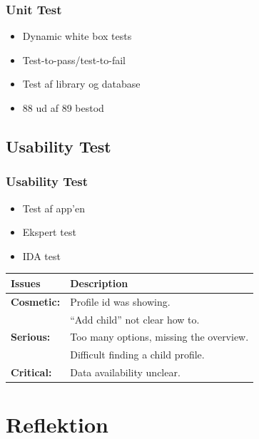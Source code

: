 \documentclass{beamer}
\begin{document}
\begin{frame}
	\frametitle{Unit Test}
	\begin{itemize}
		\item Dynamic white box tests
		\item Test-to-pass/test-to-fail
		\item Test af library og database
		\item 88 ud af 89 bestod
	\end{itemize}
\end{frame}

\subsection{Usability Test}

\begin{frame}
	\frametitle{Usability Test}
	\begin{itemize}
		\item Test af app'en
		\item Ekspert test
		\item IDA test
	\end{itemize}
	\begin{table}[!h]
	\centering
		\begin{tabular}{| p{2cm} | m{7cm} |}
			\hline
			\textbf{Issues} 	& \textbf{Description} \\ \hline
			
			\textbf{Cosmetic:}	& Profile id was showing. \\ 
								& ``Add child'' not clear how to. \\ \hline
							
			\textbf{Serious:}	& Too many options, missing the overview. \\
								& Difficult finding a child profile. \\ \hline
						
			\textbf{Critical:} 	& Data availability unclear. \\ \hline
		\end{tabular}
	\label{tab:usability_test_results}
\end{table}
\end{frame}

\section{Reflektion}
\end{document}
